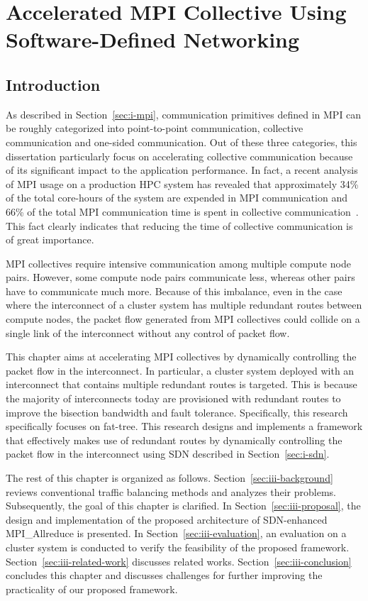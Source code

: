 \chapter{Accelerated MPI Collective Using Software-Defined Networking}\label{sec:iii}

\section{Introduction}\label{sec:iii-introduction}

As described in Section~\ref{sec:i-mpi}, communication primitives defined in
MPI can be roughly categorized into point-to-point communication, collective
communication and one-sided communication. Out of these three categories, this
dissertation particularly focus on accelerating collective communication
because of its significant impact to the application performance. In fact, a
recent analysis of MPI usage on a production HPC system has revealed that
approximately 34\% of the total core-hours of the system are expended in MPI
communication and 66\% of the total MPI communication time is spent in
collective communication~\autocite{Chunduri2018}. This fact clearly indicates
that reducing the time of collective communication is of great importance.

MPI collectives require intensive communication among multiple compute node
pairs. However, some compute node pairs communicate less, whereas other pairs
have to communicate much more. Because of this imbalance, even in the case
where the interconnect of a cluster system has multiple redundant routes
between compute nodes, the packet flow generated from MPI collectives could
collide on a single link of the interconnect without any control of packet
flow.

This chapter aims at accelerating MPI collectives by dynamically controlling
the packet flow in the interconnect. In particular, a cluster system deployed
with an interconnect that contains multiple redundant routes is targeted. This
is because the majority of interconnects today are provisioned with redundant
routes to improve the bisection bandwidth and fault tolerance. Specifically,
this research specifically focuses on fat-tree. This research designs and
implements a framework that effectively makes use of redundant routes by
dynamically controlling the packet flow in the interconnect using SDN
described in Section~\ref{sec:i-sdn}.

The rest of this chapter is organized as follows.
Section~\ref{sec:iii-background} reviews conventional traffic balancing
methods and analyzes their problems. Subsequently, the goal of this chapter is
clarified. In Section~\ref{sec:iii-proposal}, the design and implementation of
the proposed architecture of SDN-enhanced MPI\_Allreduce is presented. In
Section~\ref{sec:iii-evaluation}, an evaluation on a cluster system is
conducted to verify the feasibility of the proposed framework.
Section~\ref{sec:iii-related-work} discusses related works.
Section~\ref{sec:iii-conclusion} concludes this chapter and discusses
challenges for further improving the practicality of our proposed framework.

